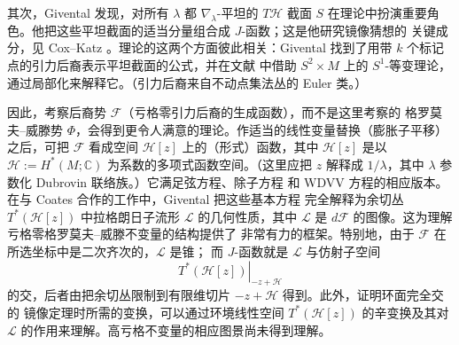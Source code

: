 其次，Givental 发现，对所有 $\lambda$ 都 $\nabla_\lambda$-平坦的 $T\mathcal H$ 截面 $S$
在理论中扮演重要角色。他把这些平坦截面的适当分量组合成 $J$-函数；这是他研究镜像猜想的
关键成分，见 Cox--Katz 。理论的这两个方面彼此相关：Givental 找到了用带 $k$
个标记点的引力后裔表示平坦截面的公式，并在文献  中借助
$S^2\times M$ 上的 $S^1$-等变理论，通过局部化来解释它。（引力后裔来自不动点集法丛的
Euler 类。）

因此，考察后裔势 $\mathcal F$（亏格零引力后裔的生成函数），而不是这里考察的
格罗莫夫--威滕势 $\Phi$，会得到更令人满意的理论。作适当的线性变量替换（膨胀子平移）
之后，可把 $\mathcal F$ 看成空间 $\mathcal H[z]$ 上的（形式）函数，其中
$\mathcal H[z]$ 是以 $\mathcal H:=H^*(M;\mathbb C)$ 为系数的多项式函数空间。（这里应把
$z$ 解释成 $1/\lambda$，其中 $\lambda$ 参数化 Dubrovin 联络族。）它满足弦方程、除子方程
和 WDVV 方程的相应版本。在与 Coates 合作的工作中，Givental  把这些基本方程
完全解释为余切丛 $T^*(\mathcal H[z])$ 中拉格朗日子流形 $\mathcal L$ 的几何性质，其中
$\mathcal L$ 是 $d\mathcal F$ 的图像。这为理解亏格零格罗莫夫--威滕不变量的结构提供了
非常有力的框架。特别地，由于 $\mathcal F$ 在所选坐标中是二次齐次的，$\mathcal L$ 是锥；
而 $J$-函数就是 $\mathcal L$ 与仿射子空间
\[
  \left.T^*(\mathcal H[z])\right|_{-z+\mathcal H}
\]
的交，后者由把余切丛限制到有限维切片 $-z+\mathcal H$ 得到。此外，证明环面完全交的
镜像定理时所需的变换，可以通过环境线性空间 $T^*(\mathcal H[z])$ 的辛变换及其对
$\mathcal L$ 的作用来理解。高亏格不变量的相应图景尚未得到理解。
